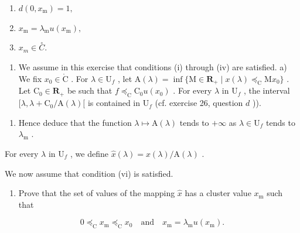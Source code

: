 \begin{enumerate}
\def\labelenumi{(\roman{enumi})}
\item
  \(d(0, x_{\mathrm{m}}) = 1,\)
\item
  \(x_{\mathrm{m}} = \lambda_{\mathrm{m}} u(x_{\mathrm{m}}),\)
\item
  \(x_{m} \in \overset{\circ}{C}.\)
\end{enumerate}

\begin{enumerate}
\def\labelenumi{\arabic{enumi})}
\setcounter{enumi}{27}
\tightlist
\item
  We assume in this exercise that conditions (i) through (iv) are satisfied. a) We fix \(x_0 \in \mathring{\mathrm{C}}\) . For \(\lambda \in \mathrm{U}_f\) , let \(\mathrm{A}(\lambda) = \inf \{\mathrm{M} \in \mathbf{R}_+ \mid x(\lambda) \preccurlyeq_{\mathrm{C}} \mathrm{M}x_0\}\) . Let \(\mathrm{C}_0 \in \mathbf{R}_+\) be such that \(f \preccurlyeq_{\mathrm{C}} \mathrm{C}_0 u(x_0)\) . For every \(\lambda\) in \(\mathrm{U}_f\) , the interval \([\lambda, \lambda + \mathrm{C}_0 / \mathrm{A}(\lambda)[\) is contained in \(\mathrm{U}_f\) (cf. exercise 26, question \(d\) )).
\end{enumerate}

\begin{enumerate}
\def\labelenumi{\alph{enumi})}
\setcounter{enumi}{1}
\tightlist
\item
  Hence deduce that the function \(\lambda \mapsto \mathrm{A}(\lambda)\) tends to \(+\infty\) as \(\lambda \in \mathrm{U}_f\) tends to \(\lambda_{\mathrm{m}}\) .
\end{enumerate}

For every \(\lambda\) in \(\mathrm{U}_f\) , we define \(\hat{x} (\lambda) = x(\lambda) / \mathrm{A}(\lambda)\) .

We now assume that condition (vi) is satisfied.

\begin{enumerate}
\def\labelenumi{\alph{enumi})}
\setcounter{enumi}{2}
\tightlist
\item
  Prove that the set of values of the mapping \(\hat{x}\) has a cluster value \(x_{\mathrm{m}}\) such that
\end{enumerate}

\[
0 \preccurlyeq_ {\mathrm{C}} x _ {\mathrm{m}} \preccurlyeq_ {\mathrm{C}} x _ {0} \quad \text {and} \quad x _ {\mathrm{m}} = \lambda_ {\mathrm{m}} u (x _ {\mathrm{m}}).
\]

